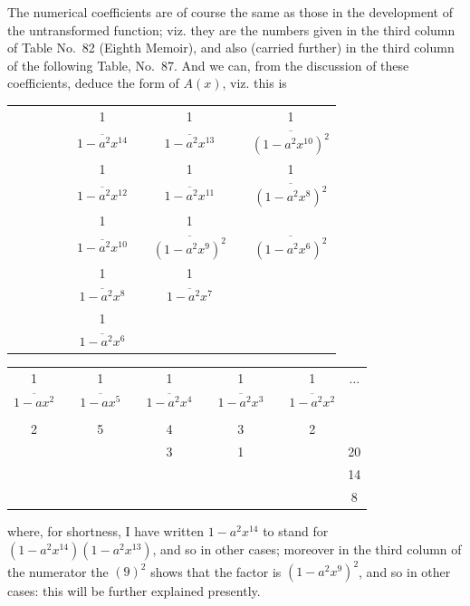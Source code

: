 \documentclass[11pt,a4paper]{article}
\begin{document}
The numerical coefficients are of course the same as those in the development of the untransformed function; viz. they are the numbers given in the third column of Table No.~82 (Eighth Memoir), and also (carried further) in the third column of the following Table, No.~87. And we can, from the discussion of these coefficients, deduce the form of $A(x)$, viz. this is
\begin{center}
\begin{tabular}{cccccccccc}
& & & & & 1 & & 1 & & 1\\
& & & & & $\overline{1-a^{2}x^{14}}$ & & $\overline{1-a^{2}x^{13}}$ & & $\overline{(1-a^{2}x^{10})^{2}}$\\[0.5em]
& & & & & 1 & & 1 & & 1\\
& & & & & $\overline{1-a^{2}x^{12}}$ & & $\overline{1-a^{2}x^{11}}$ & & $\overline{(1-a^{2}x^{8})^{2}}$\\[0.5em]
& & & & & 1 & & 1 & & \\
& & & & & $\overline{1-a^{2}x^{10}}$ & & $\overline{(1-a^{2}x^{9})^{2}}$ & & $\overline{(1-a^{2}x^{6})^{2}}$\\[0.5em]
& & & & & 1 & & 1 & & \\
& & & & & $\overline{1-a^{2}x^{8}}$ & & $\overline{1-a^{2}x^{7}}$ & & \\
[0.5em]
& & & & & 1 & & & & \\
& & & & & $\overline{1-a^{2}x^{6}}$ & & & &
\end{tabular}
\end{center}

\begin{center}
\begin{tabular}{cccccccccc}
1 & & 1 & & 1 & & 1 & & 1 & $\ldots$\\
$\overline{1-ax^{2}}$ & & $\overline{1-ax^{5}}$ & & $\overline{1-a^{2}x^{4}}$ & & $\overline{1-a^{2}x^{3}}$ & & $\overline{1-a^{2}x^{2}}$ & \\
& & & & & & & & & \\
2 & & 5 & & 4 & & 3 & & 2 & \\
& & & & 3 & & 1 & & & 20\\
& & & & & & & & & 14\\
& & & & & & & & & 8
\end{tabular}
\end{center}
where, for shortness, I have written $1-a^{2}x^{14}$ to stand for $(1-a^{2}x^{14})(1-a^{2}x^{13})$, and so in other cases; moreover in the third column of the numerator the $(9)^{2}$ shows that the factor is $(1-a^{2}x^{9})^{2}$, and so in other cases: this will be further explained presently.
\end{document}
